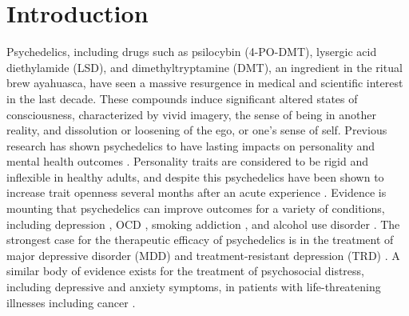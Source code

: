 
\chapter{Introduction}
    Psychedelics, including drugs such as psilocybin (4-PO-DMT), lysergic
acid diethylamide (LSD), and dimethyltryptamine (DMT), an ingredient in
the ritual brew ayahuasca, have seen a massive resurgence in medical and
scientific interest in the last decade. These compounds induce
significant altered states of consciousness, characterized by vivid
imagery, the sense of being in another reality, and dissolution or
loosening of the ego, or one's sense of self. Previous research has
shown psychedelics to have lasting impacts on personality and mental
health outcomes \parencite{Barbosa2009,Griffiths2008}.
Personality traits are considered to be rigid and inflexible in healthy
adults, and despite this psychedelics have been shown to increase trait
openness several months after an acute experience \parencite{Griffiths2011,MacLean2011, McCrae1997}. Evidence is
mounting that psychedelics can improve outcomes for a variety of
conditions, including depression \parencite{Raison2023}, OCD \parencite{Moreno2006}, smoking addiction \parencite{Johnson2017}, and alcohol
use disorder \parencite{Bogenschutz2015}. The strongest case for the
therapeutic efficacy of psychedelics is in the treatment of major depressive disorder (MDD) and treatment-resistant depression (TRD) \parencite{Carhart-Harris2021,Goodwin2022,Carhart-Harris2018c,Davis2021,Raison2023,DSouza2022}. A similar body of evidence exists for the treatment of psychosocial distress,
including depressive and anxiety symptoms, in patients with life-threatening illnesses including cancer \parencite{Griffiths2016, Grob2011, Gasser2014,Ross2016}.

